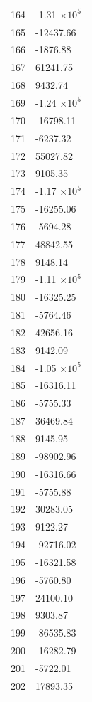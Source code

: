 \documentclass[a4paper,11pt]{article}
\begin{document}
\begin{center}
\begin{longtable}{|R{1.5cm}|R{2.5cm}|}
  164 &        -1.31 $\times 10^{           5}$ \\
  165 &    -12437.66 \\
  166 &     -1876.88 \\
  167 &     61241.75 \\
  168 &      9432.74 \\
  169 &        -1.24 $\times 10^{           5}$ \\
  170 &    -16798.11 \\
  171 &     -6237.32 \\
  172 &     55027.82 \\
  173 &      9105.35 \\
  174 &        -1.17 $\times 10^{           5}$ \\
  175 &    -16255.06 \\
  176 &     -5694.28 \\
  177 &     48842.55 \\
  178 &      9148.14 \\
  179 &        -1.11 $\times 10^{           5}$ \\
  180 &    -16325.25 \\
  181 &     -5764.46 \\
  182 &     42656.16 \\
  183 &      9142.09 \\
  184 &        -1.05 $\times 10^{           5}$ \\
  185 &    -16316.11 \\
  186 &     -5755.33 \\
  187 &     36469.84 \\
  188 &      9145.95 \\
  189 &    -98902.96 \\
  190 &    -16316.66 \\
  191 &     -5755.88 \\
  192 &     30283.05 \\
  193 &      9122.27 \\
  194 &    -92716.02 \\
  195 &    -16321.58 \\
  196 &     -5760.80 \\
  197 &     24100.10 \\
  198 &      9303.87 \\
  199 &    -86535.83 \\
  200 &    -16282.79 \\
  201 &     -5722.01 \\
  202 &     17893.35 \\

\end{longtable}
\end{center}
\end{document}
